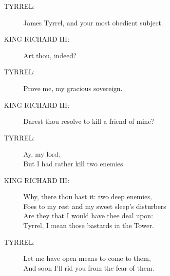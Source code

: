 \documentclass{article}
\begin{document}
\begin{description}
\item[TYRREL:] 
\hspace{1pt}James Tyrrel, and your most obedient subject.\\
\end{description}
\begin{description}
\item[KING RICHARD III:] 
\hspace{1pt}Art thou, indeed?\\
\end{description}
\begin{description}
\item[TYRREL:] 
\hspace{1pt}Prove me, my gracious sovereign.\\
\end{description}
\begin{description}
\item[KING RICHARD III:] 
\hspace{1pt}Darest thou resolve to kill a friend of mine?\\
\end{description}
\begin{description}
\item[TYRREL:] 
\hspace{1pt}Ay, my lord;\\
\hspace{1pt}But I had rather kill two enemies.\\
\end{description}
\begin{description}
\item[KING RICHARD III:] 
\hspace{1pt}Why, there thou hast it: two deep enemies,\\
\hspace{1pt}Foes to my rest and my sweet sleep's disturbers\\
\hspace{1pt}Are they that I would have thee deal upon:\\
\hspace{1pt}Tyrrel, I mean those bastards in the Tower.\\
\end{description}
\begin{description}
\item[TYRREL:] 
\hspace{1pt}Let me have open means to come to them,\\
\hspace{1pt}And soon I'll rid you from the fear of them.\\
\end{description}
\end{document}
